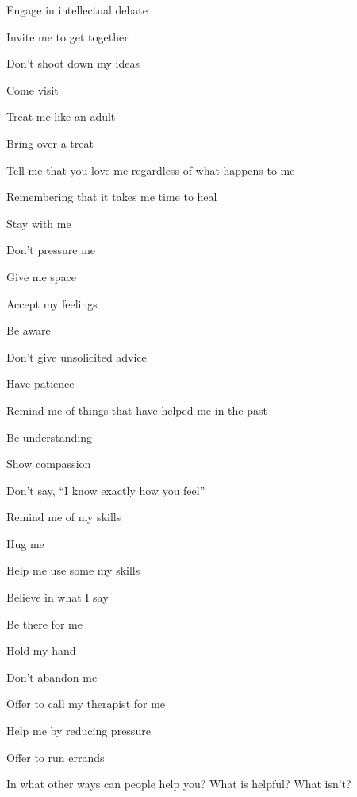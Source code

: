 \begin{multicols}{2}
\begin{checkboxlist}
\item Engage in intellectual debate
\item Invite me to get together
\item Don’t shoot down my ideas
\item Come visit
\item Treat me like an adult
\item Bring over a treat
\item Tell me that you love me regardless of what happens to me
\item Remembering that it takes me time to heal
\item Stay with me
\item Don’t pressure me
\item Give me space
\item Accept my feelings
\item Be aware
\item Don’t give unsolicited advice
\item Have patience
\item Remind me of things that have helped me in the past
\item Be understanding
\item Show compassion
\item Don’t say, “I know exactly how you feel”
\item Remind me of my skills
\item Hug me
\item Help me use some my skills
\item Believe in what I say
\item Be there for me
\item Hold my hand
\item Don’t abandon me
\item Offer to call my therapist for me
\item Help me by reducing pressure
\item Offer to run errands
\end{checkboxlist}
\end{multicols}

In what other ways can people help you?
What is helpful? What isn’t?
